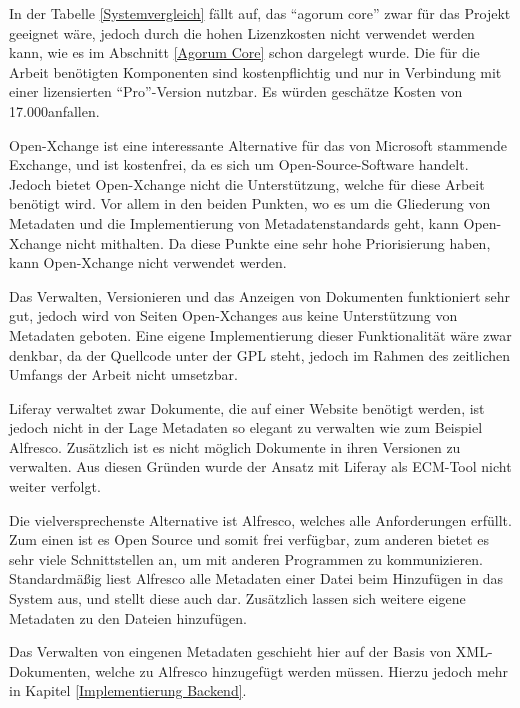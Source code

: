 In der Tabelle \ref{Systemvergleich} f\"allt auf, das "`agorum core"' zwar f\"ur das Projekt geeignet w\"are, jedoch durch die hohen Lizenzkosten nicht verwendet werden kann, wie es im Abschnitt \ref{Agorum Core} schon dargelegt wurde. Die f\"ur die Arbeit ben\"otigten Komponenten sind kostenpflichtig und nur in Verbindung mit einer lizensierten "`Pro"'-Version nutzbar. Es w\"urden gesch\"atze Kosten von 17.000\EUR  anfallen.

Open-Xchange ist eine interessante Alternative f\"ur das von Microsoft stammende Exchange, und ist kostenfrei, da es sich um Open-Source-Software handelt. Jedoch bietet Open-Xchange nicht die Unterst\"utzung, welche f\"ur diese Arbeit ben\"otigt wird. Vor allem in den beiden Punkten, wo es um die Gliederung von Metadaten und die Implementierung von Metadatenstandards geht, kann Open-Xchange nicht mithalten. Da diese Punkte eine sehr hohe Priorisierung haben, kann Open-Xchange nicht verwendet werden.

Das Verwalten, Versionieren und das Anzeigen von Dokumenten funktioniert sehr gut, jedoch wird von Seiten Open-Xchanges aus keine Unterst\"utzung von Metadaten geboten. Eine eigene Implementierung dieser Funktionalit\"at w\"are zwar denkbar, da der Quellcode unter der \ac{GPL} steht, jedoch im Rahmen des zeitlichen Umfangs der Arbeit nicht umsetzbar.

Liferay verwaltet zwar Dokumente, die auf einer Website ben\"otigt werden, ist jedoch nicht in der Lage Metadaten so elegant zu verwalten wie zum Beispiel Alfresco. Zus\"atzlich ist es nicht m\"oglich Dokumente in ihren Versionen zu verwalten. Aus diesen Gr\"unden wurde der Ansatz mit Liferay als ECM-Tool nicht weiter verfolgt.

Die vielversprechenste Alternative ist Alfresco, welches alle Anforderungen erf\"ullt. Zum einen ist es Open Source und somit frei verf\"ugbar, zum anderen bietet es sehr viele Schnittstellen an, um mit anderen Programmen zu kommunizieren. Standardm\"a\ss{}ig liest Alfresco alle Metadaten einer Datei beim Hinzuf\"ugen in das System aus, und stellt diese auch dar. Zus\"atzlich lassen sich weitere eigene Metadaten zu den Dateien hinzuf\"ugen. 

Das Verwalten von eingenen Metadaten geschieht hier auf der Basis von XML-Dokumenten, welche zu Alfresco hinzugef\"ugt werden m\"ussen.
Hierzu jedoch mehr in Kapitel \ref{Implementierung Backend}.

